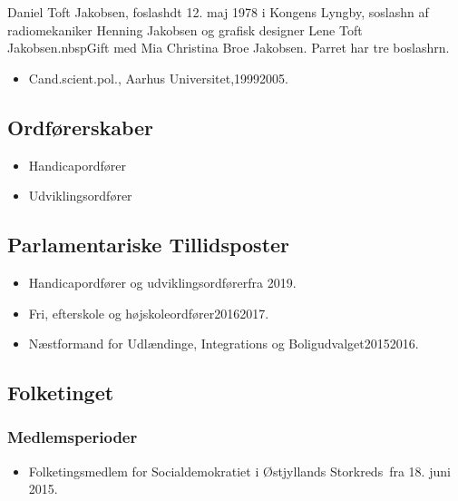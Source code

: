 \documentclass[11pt, a4paper]{awesome-cv}
\begin{document}
\makecvheader[R]
\makelettertitle
\begin{cvletter}
Daniel Toft Jakobsen, foslashdt 12. maj 1978 i Kongens Lyngby, soslashn af radiomekaniker Henning Jakobsen og grafisk designer Lene Toft Jakobsen.nbspGift med Mia Christina Broe Jakobsen. Parret har tre boslashrn.

\begin{itemize}
\item Cand.scient.pol., Aarhus Universitet,19992005.
\end{itemize}
\subsection*{Ordførerskaber}
\begin{itemize}
\item Handicapordfører
\item Udviklingsordfører
\end{itemize}
\subsection*{Parlamentariske Tillidsposter}
\begin{itemize}
\item Handicapordfører og udviklingsordførerfra 2019.
\item Fri, efterskole og højskoleordfører20162017.
\item Næstformand for Udlændinge, Integrations og Boligudvalget20152016.
\end{itemize}
\subsection*{Folketinget}
\subsubsection*{Medlemsperioder}
\begin{itemize}
\item Folketingsmedlem for Socialdemokratiet i Østjyllands Storkreds fra 18. juni 2015.
\end{itemize}

\end{cvletter}
\end{document}
